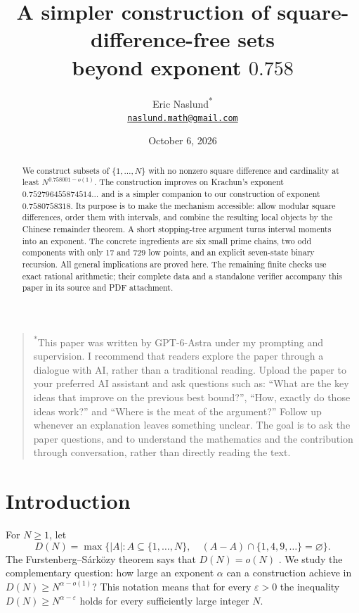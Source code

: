 \documentclass[11pt]{article}
\title{A simpler construction of square-difference-free sets\\beyond exponent $0.758$}
\author{Eric Naslund\textsuperscript{*}\\[3pt]
\normalsize\href{mailto:naslund.math@gmail.com}{\texttt{naslund.math@gmail.com}}}
\date{October 6, 2026}
\theoremstyle{definition}
\theoremstyle{remark}
\begin{document}
\maketitle
\begin{quote}
\small\noindent\textsuperscript{*}This paper was written by GPT-6-Astra under my prompting and supervision.
I recommend that readers explore the paper through a dialogue with AI, rather than a traditional reading.
Upload the paper to your preferred AI assistant and ask questions such as: ``What are the key ideas that improve on the previous best bound?'', ``How, exactly do those ideas work?'' and ``Where is the meat of the argument?''
Follow up whenever an explanation leaves something unclear.
The goal is to ask the paper questions, and to understand the mathematics and the contribution through conversation, rather than directly reading the text.
\end{quote}
\begin{abstract}
We construct subsets of $\{1,\ldots,N\}$ with no nonzero square difference
and cardinality at least $N^{0.758001-o(1)}$. The construction improves on
Krachun's exponent $0.752796455874514\ldots$ and is a simpler companion to
our construction of exponent $0.7580758318$. Its purpose is to make the
mechanism accessible: allow modular square differences, order them with
intervals, and combine the resulting local objects by the Chinese remainder
theorem. A short stopping-tree argument turns interval moments into an
exponent. The concrete ingredients are six small prime chains, two odd
components with only 17 and 729 low points, and an explicit seven-state
binary recursion. All general implications are proved here. The remaining
finite checks use exact rational arithmetic; their complete data and a
standalone verifier accompany this paper in its source and PDF attachment.
\end{abstract}

\section{Introduction}
For $N\ge1$, let
\[
 D(N)=\max\bigl\{|A|:A\subseteq\{1,\ldots,N\},\quad
 (A-A)\cap\{1,4,9,\ldots\}=\varnothing\bigr\}.
\]
The Furstenberg--S\'ark\"ozy theorem says that $D(N)=o(N)$
\cite{Furstenberg1977,Sarkozy1978}. We study the complementary question:
how large an exponent $\alpha$ can a construction achieve in
$D(N)\ge N^{\alpha-o(1)}$? This notation means that for every
$\varepsilon>0$ the inequality $D(N)\ge N^{\alpha-\varepsilon}$ holds
for every sufficiently large integer $N$.
\end{document}
